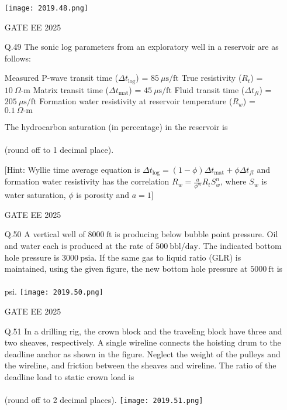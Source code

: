 \documentclass{article}
\begin{document}
\begin{enumerate}[leftmargin=*,series=q]
\texttt{[image: 2019.48.png]}

GATE EE 2025
 \vspace{0.5cm} 

\item[Q.49] The sonic log parameters from an exploratory well in a reservoir are as follows:  

Measured P-wave transit time ($\Delta t_{\text{log}}$) = $85 \ \mu\text{s/ft}$  
True resistivity ($R_{t}$) = $10 \ \Omega\text{-m}$  
Matrix transit time ($\Delta t_{\text{mat}}$) = $45 \ \mu\text{s/ft}$  
Fluid transit time ($\Delta t_{fl}$) = $205 \ \mu\text{s/ft}$  
Formation water resistivity at reservoir temperature ($R_{w}$) = $0.1 \ \Omega\text{-m}$  

The hydrocarbon saturation (in percentage) in the reservoir is \\\\ (round off to 1 decimal place).  

[Hint: Wyllie time average equation is $\Delta t_{\text{log}} = (1 - \phi)\Delta t_{\text{mat}} + \phi \Delta t_{fl}$ and formation water resistivity has the correlation $R_{w} = \frac{a}{\phi^{m}} R_{t} S_{w}^{n}$, where $S_{w}$ is water saturation, $\phi$ is porosity and $a = 1$]  

GATE EE 2025
\vspace{0.5cm}
\item[Q.50] A vertical well of $8000 \ \text{ft}$ is producing below bubble point pressure. Oil and water each is produced at the rate of $500 \ \text{bbl/day}$. The indicated bottom hole pressure is $3000 \ \text{psia}$. If the same gas to liquid ratio (GLR) is maintained, using the given figure, the new bottom hole pressure at $5000 \ \text{ft}$ is \\\\ psi.  
\texttt{[image: 2019.50.png]}

GATE EE 2025
\vspace{0.5cm}
\item[Q.51] In a drilling rig, the crown block and the traveling block have three and two sheaves, respectively. A single wireline connects the hoisting drum to the deadline anchor as shown in the figure. Neglect the weight of the pulleys and the wireline, and friction between the sheaves and wireline. The ratio of the deadline load to static crown load is \\\\ (round off to 2 decimal places).  
\texttt{[image: 2019.51.png]}


\end{enumerate}
\end{document}
